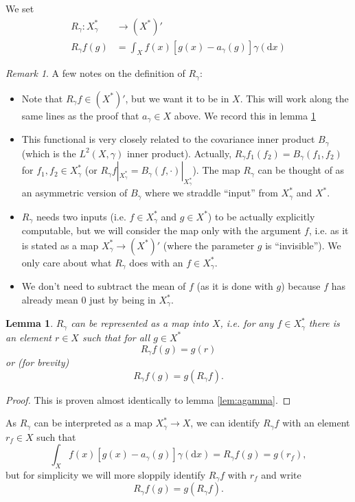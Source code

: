 \documentclass{scrartcl}
\newtheorem{lemma}{Lemma}
\theoremstyle{definition}
\theoremstyle{remark}
\newtheorem{remark}{Remark}
\newcommand{\de}{\mathrm d}
\begin{document}
We set
\begin{align*}
R_\gamma : X_\gamma^* & \to (X^*)'\\
R_\gamma f (g) &= \int_X f(x) [g(x)-a_\gamma(g)]\gamma(\de x)
\end{align*}
\begin{remark}
A few notes on the definition of $R_\gamma$:
\begin{itemize}
\item Note that $R_\gamma f \in (X^*)'$, but we want it to be in $X$. This will work along the same lines as the proof that $a_\gamma\in X$ above. We record this in lemma \ref{lem:Rgamma}
\item This functional is very closely related to the covariance inner product $B_\gamma$ (which is the $L^2(X, \gamma)$ inner product). Actually, $R_\gamma f_1 (f_2) = B_\gamma (f_1, f_2)$ for $f_1, f_2\in X_\gamma^*$ (or $R_\gamma f|_{X_\gamma^*} = B_\gamma(f, \cdot)|_{X_\gamma^*}$). The map $R_\gamma$ can be thought of as an asymmetric version of $B_\gamma$ where we straddle ``input'' from $X_\gamma^*$ and $X^*$.
\item $R_\gamma$ needs two inputs (i.e. $f\in X_\gamma^*$ and $g\in X^*$) to be actually explicitly computable, but we will consider the map only with the argument $f$, i.e. as it is stated as a map $X_\gamma^* \to (X^*)'$ (where the parameter $g$ is ``invisible''). We only care about what $R_\gamma$ does with an $f\in X_\gamma^*$.
\item  We don't need to subtract the mean of $f$ (as it is done with $g$) because $f$ has already mean $0$ just by being in $X_\gamma^*$.
\end{itemize}
\end{remark}
\begin{lemma}\label{lem:Rgamma}
$R_\gamma$ can be represented as a map into $X$, i.e. for any $f\in X_\gamma^*$ there is an element $r\in X$ such that for all $g\in X^*$
\[R_\gamma f(g) = g(r)\]
or (for brevity)
\[R_\gamma f(g) = g(R_\gamma f).\]
\end{lemma}
\begin{proof}
This is proven almost identically to lemma \ref{lem:agamma}.
\end{proof}

As $R_\gamma$ can be interpreted as a map $X_\gamma^* \to X$, we can identify $R_\gamma f$ with an element $r_f\in X$ such that 
\begin{equation}\label{eq:reconstructingkernel}
\int_X f(x) [g(x)-a_\gamma(g)]\gamma(\de x) = R_\gamma f(g) = g(r_f),
\end{equation}
but for simplicity we will more sloppily identify $R_\gamma f$ with $r_f$ and write
\[ R_\gamma f(g) = g(R_\gamma f).\]
\end{document}
